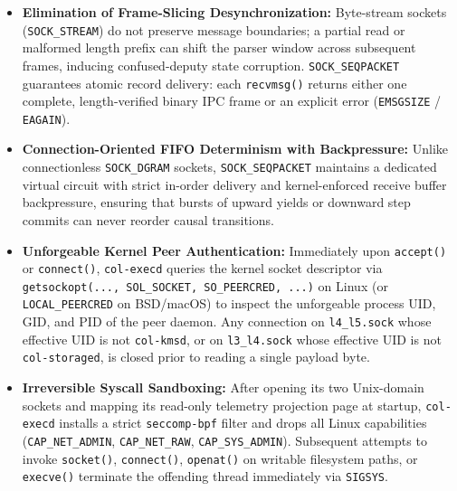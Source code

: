 \begin{itemize}
\item \textbf{Elimination of Frame-Slicing Desynchronization:} Byte-stream sockets
        (\texttt{SOCK\_STREAM}) do not preserve message boundaries; a partial read or
        malformed length prefix can shift the parser window across subsequent frames,
        inducing confused-deputy state corruption. \texttt{SOCK\_SEQPACKET} guarantees
        atomic record delivery: each \texttt{recvmsg()} returns either one complete,
        length-verified binary IPC frame or an explicit error (\texttt{EMSGSIZE} /
        \texttt{EAGAIN}).
\item \textbf{Connection-Oriented FIFO Determinism with Backpressure:} Unlike connectionless
        \texttt{SOCK\_DGRAM} sockets, \texttt{SOCK\_SEQPACKET} maintains a dedicated virtual
        circuit with strict in-order delivery and kernel-enforced receive buffer
        backpressure, ensuring that bursts of upward yields or downward step commits can
        never reorder causal transitions.
\item \textbf{Unforgeable Kernel Peer Authentication:} Immediately upon \texttt{accept()} or
        \texttt{connect()}, \texttt{col-execd} queries the kernel socket descriptor via
        \texttt{getsockopt(..., SOL\_SOCKET, SO\_PEERCRED, ...)} on Linux (or
        \texttt{LOCAL\_PEERCRED} on BSD/macOS) to inspect the unforgeable process UID, GID,
        and PID of the peer daemon. Any connection on \texttt{l4\_l5.sock} whose effective
        UID is not \texttt{col-kmsd}, or on \texttt{l3\_l4.sock} whose effective UID is not
        \texttt{col-storaged}, is closed prior to reading a single payload byte.
\item \textbf{Irreversible Syscall Sandboxing:} After opening its two Unix-domain sockets
        and mapping its read-only telemetry projection page at startup, \texttt{col-execd}
        installs a strict \texttt{seccomp-bpf} filter and drops all Linux capabilities
        (\texttt{CAP\_NET\_ADMIN}, \texttt{CAP\_NET\_RAW}, \texttt{CAP\_SYS\_ADMIN}).
        Subsequent attempts to invoke \texttt{socket()}, \texttt{connect()},
        \texttt{openat()} on writable filesystem paths, or \texttt{execve()} terminate the
        offending thread immediately via \texttt{SIGSYS}.
\end{itemize}

